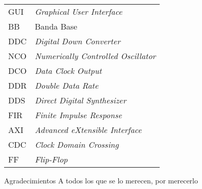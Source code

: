 \documentclass[screen, pagebackref,oneside]{ibtesis}
\begin{document}
\begin{preliminary}
\begin{abreviaturas}
\begin{table}[H]
\begin{tabular}{ll}
            GUI &   \textit{Graphical User Interface}   \\
            BB  &   Banda Base  \\
            DDC &   \textit{Digital Down Converter} \\
            NCO &   \textit{Numerically Controlled Oscillator}  \\
            DCO &   \textit{Data Clock Output}  \\
            DDR &   \textit{Double Data Rate}   \\
            DDS &   \textit{Direct Digital Synthesizer} \\
            FIR &   \textit{Finite Impulse Response}    \\
            AXI &   \textit{Advanced eXtensible Interface}  \\
            CDC &   \textit{Clock Domain Crossing}  \\
            FF  &   \textit{Flip-Flop}
            \end{tabular}
        \end{table}    
    \end{abreviaturas}
    
    \tableofcontents                %
    \listoffigures                  %
    \listoftables                   %
    
    
\end{preliminary}











\appendix


\begin{biblio}
    
\end{biblio}

\begin{postliminary}

    \begin{seccion}{Agradecimientos}
    A todos los que se lo merecen, por merecerlo
    \end{seccion}
    
\end{postliminary}
    
\end{document}

